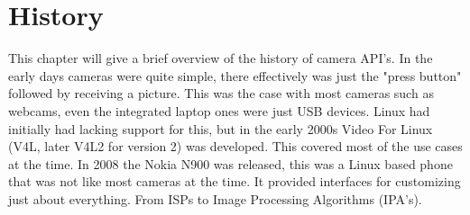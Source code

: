 \chapter{History\label{history}}
This chapter will give a brief overview of the history of camera API's. In the
early days cameras were quite simple, there effectively was just the "press
button" followed by receiving a picture. This was the case with most cameras
such as webcams, even the integrated laptop ones were just USB devices. Linux
had initially had lacking support for this, but in the early 2000s Video For
Linux (V4L, later V4L2 for version 2) was developed. This covered most of the
use cases at the time. In 2008 the Nokia N900 was released, this was a Linux
based phone that was not like most cameras at the time. It provided interfaces
for customizing just about everything. From ISPs to Image Processing Algorithms
(IPA's).
